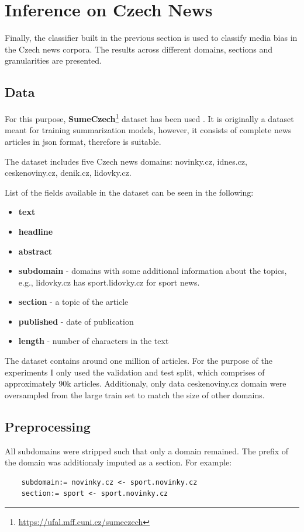 \chapter{Inference on Czech News}\label{inference}
Finally, the classifier built in the previous section is used to classify media bias in the Czech news corpora. The results across different domains, sections and granularities are presented.




\section{Data}
For this purpose, \textbf{SumeCzech}\footnote{\url{https://ufal.mff.cuni.cz/sumeczech}} dataset has been used \cite{straka2018sumeczech}. It is originally a dataset meant for training summarization models, however, it consists of complete news articles in json format, therefore is suitable.

The dataset includes five Czech news domains: novinky.cz, idnes.cz, ceskenoviny.cz, denik.cz, lidovky.cz. 

List of the fields available in the dataset can be seen in the following:
\begin{itemize}
    \item \textbf{text} 
    \item \textbf{headline}
    \item \textbf{abstract}
    \item \textbf{subdomain} - domains with some additional information about the topics, e.g., lidovky.cz has sport.lidovky.cz for sport news.
    \item \textbf{section} - a topic of the article
    \item \textbf{published} - date of publication
    \item \textbf{length} - number of characters in the text
\end{itemize}

The dataset contains around one million of articles. For the purpose of the experiments I only used the validation and test split, which comprises of approximately 90k articles. Additionaly, only data ceskenoviny.cz domain were oversampled from the large train set to match the size of other domains.


\section{Preprocessing}
All subdomains were stripped such that only a domain remained. The prefix of the domain was additionaly imputed as a section. For example:
\begin{verbatim}
    subdomain:= novinky.cz <- sport.novinky.cz 
    section:= sport <- sport.novinky.cz
\end{verbatim}

